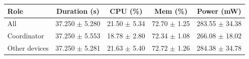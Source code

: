 \begin{tabular}{lcccc}
\hline
\textbf{Role} & \textbf{Duration (s)} & \textbf{CPU (\%)} & \textbf{Mem (\%)} & \textbf{Power (mW)} \\
\hline
All & 37.250 $\pm$ 5.280 & 21.50 $\pm$ 5.34 & 72.70 $\pm$ 1.25 & 283.55 $\pm$ 34.38 \\
Coordinator & 37.250 $\pm$ 5.553 & 18.78 $\pm$ 2.80 & 72.34 $\pm$ 1.08 & 266.08 $\pm$ 18.02 \\
Other devices & 37.250 $\pm$ 5.281 & 21.63 $\pm$ 5.40 & 72.72 $\pm$ 1.26 & 284.38 $\pm$ 34.78 \\
\hline
\end{tabular}
